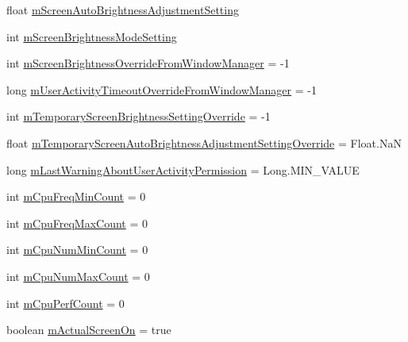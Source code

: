 \begin{DoxyCompactItemize}
float \hyperlink{classcom_1_1android_1_1server_1_1power_1_1PowerManagerService_aed41fa36c75f829cf26d0b4100cbb7e8}{m\-Screen\-Auto\-Brightness\-Adjustment\-Setting}
\item 
int \hyperlink{classcom_1_1android_1_1server_1_1power_1_1PowerManagerService_a007da098d9b9b14d6eb37b6db50d0901}{m\-Screen\-Brightness\-Mode\-Setting}
\item 
int \hyperlink{classcom_1_1android_1_1server_1_1power_1_1PowerManagerService_ad807e892554d71487e838c5524adede1}{m\-Screen\-Brightness\-Override\-From\-Window\-Manager} = -\/1
\item 
long \hyperlink{classcom_1_1android_1_1server_1_1power_1_1PowerManagerService_a150f20be944612bed325176630ad2939}{m\-User\-Activity\-Timeout\-Override\-From\-Window\-Manager} = -\/1
\item 
int \hyperlink{classcom_1_1android_1_1server_1_1power_1_1PowerManagerService_a83b5f79bfd2d7ce16b69382d33cabc33}{m\-Temporary\-Screen\-Brightness\-Setting\-Override} = -\/1
\item 
float \hyperlink{classcom_1_1android_1_1server_1_1power_1_1PowerManagerService_af1290df33424ce977ca577b1703e62aa}{m\-Temporary\-Screen\-Auto\-Brightness\-Adjustment\-Setting\-Override} = Float.\-Na\-N
\item 
long \hyperlink{classcom_1_1android_1_1server_1_1power_1_1PowerManagerService_a7b1fdeb6ec3ee874453c0ba243f866f9}{m\-Last\-Warning\-About\-User\-Activity\-Permission} = Long.\-M\-I\-N\-\_\-\-V\-A\-L\-U\-E
\item 
int \hyperlink{classcom_1_1android_1_1server_1_1power_1_1PowerManagerService_aaec68d98d14dc715ea7796105c2f39d1}{m\-Cpu\-Freq\-Min\-Count} = 0
\item 
int \hyperlink{classcom_1_1android_1_1server_1_1power_1_1PowerManagerService_a980c643c23ace40c5127faebc6e6ad06}{m\-Cpu\-Freq\-Max\-Count} = 0
\item 
int \hyperlink{classcom_1_1android_1_1server_1_1power_1_1PowerManagerService_a447394a482656402a215028583d59a8f}{m\-Cpu\-Num\-Min\-Count} = 0
\item 
int \hyperlink{classcom_1_1android_1_1server_1_1power_1_1PowerManagerService_af54d36774ed17d3f3ce4bd98debbfefe}{m\-Cpu\-Num\-Max\-Count} = 0
\item 
int \hyperlink{classcom_1_1android_1_1server_1_1power_1_1PowerManagerService_adf09be0341d9225fa98041f0c2b0abca}{m\-Cpu\-Perf\-Count} = 0
\item 
boolean \hyperlink{classcom_1_1android_1_1server_1_1power_1_1PowerManagerService_a41f319293891c19eb1652b61b9cc4789}{m\-Actual\-Screen\-On} = true

\end{DoxyCompactItemize}
